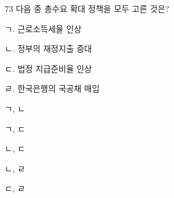 \begin{question}{73}
다음 중 총수요 확대 정책을 모두 고른 것은?
\begin{framedtext}
ㄱ. 근로소득세율 인상 \par
ㄴ. 정부의 재정지출 증대 \par
ㄷ. 법정 지급준비율 인상 \par
ㄹ. 한국은행의 국공채 매입 \par
\end{framedtext}
\begin{choices}
  \item ㄱ, ㄴ
  \item ㄱ, ㄷ
  \item ㄴ, ㄷ
  \item ㄴ, ㄹ
  \item ㄷ, ㄹ
\end{choices}
\end{question}
